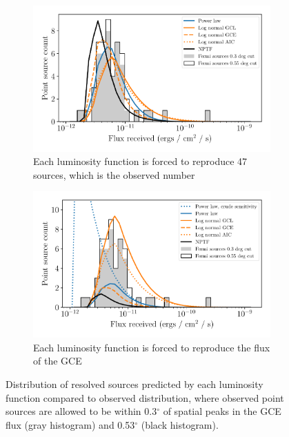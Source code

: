 \documentclass[a4paper,11pt]{article}
\begin{document}
\begin{figure}
    \centering
    \begin{subfigure}[b]{0.47\textwidth}
        \includegraphics[width=\textwidth]{figs/flux-distro-fix-count.pdf}
        \caption{Each luminosity function is forced to reproduce 47 sources, which is the observed number}
        \label{fig:flux-distro-fix-count}
    \end{subfigure}
    \hfill
    \begin{subfigure}[b]{0.47\textwidth}
        \includegraphics[width=\textwidth]{figs/flux-distro-fix-flux.pdf}
        \caption{Each luminosity function is forced to reproduce the flux of the GCE}
        \label{fig:flux-distro-fix-flux}
    \end{subfigure}
    \caption{Distribution of resolved sources predicted by each luminosity function compared to observed distribution, where observed point sources are allowed to be within 0.3$^\circ$ of spatial peaks in the GCE flux (gray histogram) and 0.53$^\circ$ (black histogram).}
    \label{fig:flux-distro}
\end{figure}
\end{document}
